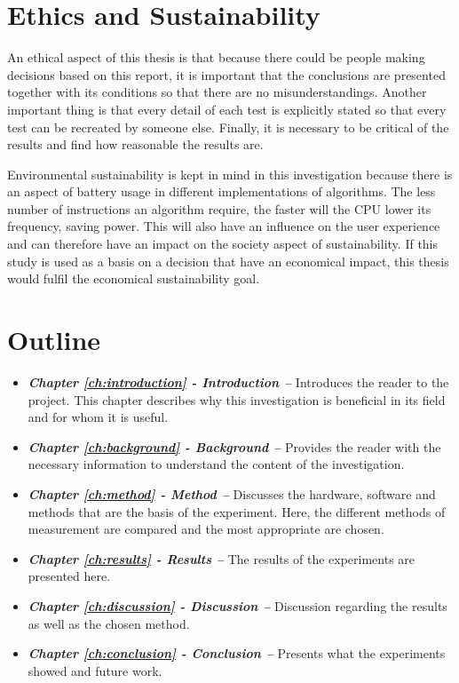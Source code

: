 \section{Ethics and Sustainability}
An ethical aspect of this thesis is that because there could be people making decisions based on this report, it is important that the conclusions are presented together with its conditions so that there are no misunderstandings. Another important thing is that every detail of each test is explicitly stated so that every test can be recreated by someone else. Finally, it is necessary to be critical of the results and find how reasonable the results are.

Environmental sustainability is kept in mind in this investigation because there is an aspect of battery usage in different implementations of algorithms. The less number of instructions an algorithm require, the faster will the CPU lower its frequency, saving power. This will also have an influence on the user experience and can therefore have an impact on the society aspect of sustainability. If this study is used as a basis on a decision that have an economical impact, this thesis would fulfil the economical sustainability goal.

\section{Outline}
\begin{itemize}
    \item \textit{\textbf{Chapter \ref{ch:introduction} - Introduction --}} Introduces the reader to the project. This chapter describes why this investigation is beneficial in its field and for whom it is useful.
    \item \textit{\textbf{Chapter \ref{ch:background} - Background --}} Provides the reader with the necessary information to understand the content of the investigation.
    \item \textit{\textbf{Chapter \ref{ch:method} - Method --}} Discusses the hardware, software and methods that are the basis of the experiment. Here, the different methods of measurement are compared and the most appropriate are chosen.
    \item \textit{\textbf{Chapter \ref{ch:results} - Results --}} The results of the experiments are presented here.
    \item \textit{\textbf{Chapter \ref{ch:discussion} - Discussion --}} Discussion regarding the results as well as the chosen method.
    \item \textit{\textbf{Chapter \ref{ch:conclusion} - Conclusion --}} Presents what the experiments showed and future work.
\end{itemize}
